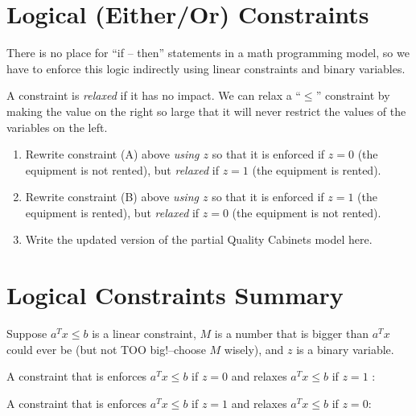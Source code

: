 \documentclass[11pt]{article}
\theoremstyle{definition}
\newcommand{\answerbox}[3]{%
  \fbox{%
    \begin{minipage}[#1]{#2}
      \hfill\vspace{#3}
    \end{minipage}
  }
}
\begin{document}
\section{Logical (Either/Or) Constraints}
There is no place for ``if -- then'' statements in a math programming model, so we have to enforce this logic indirectly using linear constraints and binary variables.

\begin{tcolorbox}
A constraint is \emph{relaxed} if it has no impact.  We can relax a ``$\leq$'' constraint by making the value on the right so large that it will never restrict the values of the variables on the left.
\end{tcolorbox}

\begin{enumerate}[resume]
\item Rewrite constraint (A) above \emph{using $z$} so that it is enforced if $z = 0$ (the equipment is not rented), but \emph{relaxed} if $z = 1$ (the equipment is rented). \\ 
\vspace{2in}

\item Rewrite constraint (B) above \emph{using $z$} so that it is enforced if $z = 1$ (the equipment is rented), but \emph{relaxed} if $z = 0$ (the equipment is not rented). \\ 
\newpage

\item Write the updated version of the partial Quality Cabinets model here.\\
\vspace{3in}
\end{enumerate}

\section{Logical Constraints Summary}

\begin{tcolorbox}
Suppose $a^{T}x \leq b$ is a linear constraint, $M$ is a number that is bigger than $a^{T}x$ could ever be (but not TOO big!--choose $M$ wisely), and $z$ is a binary variable.  
\bigskip

A constraint that is enforces $a^{T}x \leq b$ if $z = 0$ and relaxes $a^{T}x \leq b$ if $z=1$ :

\begin{center}
\answerbox{c}{4in}{0.3in}
\end{center}

\bigskip
A constraint that is enforces $a^{T}x \leq b$ if $z = 1$ and relaxes $a^{T}x \leq b$ if $z=0$:

\begin{center}
\answerbox{c}{4in}{0.3in}
\end{center}

\bigskip
\end{tcolorbox}
\end{document}

